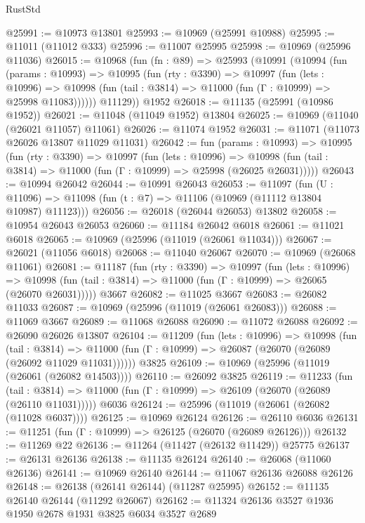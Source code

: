 \begin{lexlean}{RustStd}
\begin{coremodule}
@25991 := @10973 @13801
@25993 := @10969 (@25991 @10988)
@25995 := @11011 (@11012 @333)
@25996 := @11007 @25995
@25998 := @10969 (@25996 @11036)
@26015 := @10968
    (fun (fn : @89) =>
    @25993
      (@10991
        (@10994
          (fun (params : @10993) =>
          @10995
            (fun (rty : @3390) =>
            @10997
              (fun (lets : @10996) =>
              @10998 (fun (tail : @3814) => @11000 (fun (Γ : @10999) => @25998 @11083))))))
        @11129))
    @1952
@26018 := @11135 (@25991 (@10986 @1952))
@26021 := @11048 (@11049 @1952) @13804
@26025 := @10969 (@11040 (@26021 @11057) @11061)
@26026 := @11074 @1952
@26031 := @11071 (@11073 @26026 @13807 @11029 @11031)
@26042 := fun (params : @10993) =>
  @10995
    (fun (rty : @3390) =>
    @10997
      (fun (lets : @10996) =>
      @10998 (fun (tail : @3814) => @11000 (fun (Γ : @10999) => @25998 (@26025 @26031)))))
@26043 := @10994 @26042
@26044 := @10991 @26043
@26053 := @11097
    (fun (U : @11096) => @11098 (fun (t : @7) => @11106 (@10969 (@11112 @13804 @10987) @11123)))
@26056 := @26018 (@26044 @26053) @13802
@26058 := @10954 @26043 @26053
@26060 := @11184 @26042 @6018
@26061 := @11021 @6018
@26065 := @10969 (@25996 (@11019 (@26061 @11034)))
@26067 := @26021 (@11056 @6018)
@26068 := @11040 @26067
@26070 := @10969 (@26068 @11061)
@26081 := @11187
    (fun (rty : @3390) =>
    @10997
      (fun (lets : @10996) =>
      @10998 (fun (tail : @3814) => @11000 (fun (Γ : @10999) => @26065 (@26070 @26031)))))
    @3667
@26082 := @11025 @3667
@26083 := @26082 @11033
@26087 := @10969 (@25996 (@11019 (@26061 @26083)))
@26088 := @11069 @3667
@26089 := @11068 @26088
@26090 := @11072 @26088
@26092 := @26090 @26026 @13807
@26104 := @11209
    (fun (lets : @10996) =>
    @10998
      (fun (tail : @3814) =>
      @11000 (fun (Γ : @10999) => @26087 (@26070 (@26089 (@26092 @11029 @11031))))))
    @3825
@26109 := @10969 (@25996 (@11019 (@26061 (@26082 @14503))))
@26110 := @26092 @3825
@26119 := @11233
    (fun (tail : @3814) => @11000 (fun (Γ : @10999) => @26109 (@26070 (@26089 (@26110 @11031)))))
    @6036
@26124 := @25996 (@11019 (@26061 (@26082 (@11028 @6037))))
@26125 := @10969 @26124
@26126 := @26110 @6036
@26131 := @11251 (fun (Γ : @10999) => @26125 (@26070 (@26089 @26126)))
@26132 := @11269 @22
@26136 := @11264 (@11427 (@26132 @11429)) @25775
@26137 := @26131 @26136
@26138 := @11135 @26124
@26140 := @26068 (@11060 @26136)
@26141 := @10969 @26140
@26144 := @11067 @26136 @26088 @26126
@26148 := @26138 (@26141 @26144) (@11287 @25995)
@26152 := @11135 @26140 @26144 (@11292 @26067)
@26162 := @11324 @26136 @3527 @1936 @1950 @2678 @1931 @3825 @6034 @3527 @2689

\end{coremodule}
\end{lexlean}
